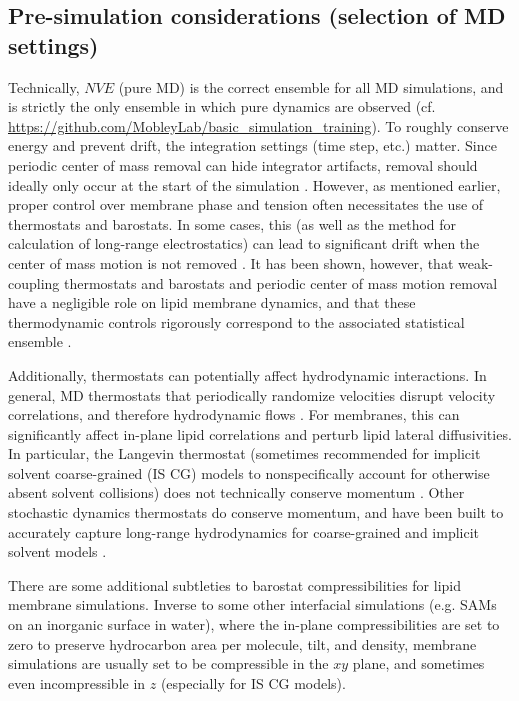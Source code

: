 \documentclass[9pt,bestpractices]{livecoms}
\begin{document}
\subsection{Pre-simulation considerations (selection of MD settings)}
\label{subsec:presim4}

Technically, $NVE$ (pure MD) is the correct ensemble for all MD simulations, and is strictly the only ensemble in which pure dynamics are observed (cf. \url{https://github.com/MobleyLab/basic_simulation_training}).
To roughly conserve energy and prevent drift, the integration settings (time step, etc.) matter.
Since periodic center of mass removal can hide integrator artifacts, removal should ideally only occur at the start of the simulation \cite{Zgorski2016}.
However, as mentioned earlier, proper control over membrane phase and tension often necessitates the use of thermostats and barostats.
In some cases, this (as well as the method for calculation of long-range electrostatics) can lead to significant drift when the center of mass motion is not removed \cite{Zgorski2016}.
It has been shown, however, that weak-coupling thermostats and barostats and periodic center of mass motion removal have a negligible role on lipid membrane dynamics, and that these thermodynamic controls rigorously correspond to the associated statistical ensemble \cite{Venable2017}.

Additionally, thermostats can potentially affect hydrodynamic interactions.
In general, MD thermostats that periodically randomize velocities disrupt velocity correlations, and therefore hydrodynamic flows \cite{Zgorski2016}.
For membranes, this can significantly affect in-plane lipid correlations and perturb lipid lateral diffusivities.
In particular, the Langevin thermostat (sometimes recommended for implicit solvent coarse-grained (IS CG) models to nonspecifically account for otherwise absent solvent collisions) does not technically conserve momentum \cite{Goga2012}.
Other stochastic dynamics thermostats do conserve momentum, and have been built to accurately capture long-range hydrodynamics for coarse-grained and implicit solvent models \cite{Zgorski2016,Wang2013}.

There are some additional subtleties to barostat compressibilities for lipid membrane simulations.
Inverse to some other interfacial simulations (e.g. SAMs on an inorganic surface in water), where the in-plane compressibilities are set to zero to preserve hydrocarbon area per molecule, tilt, and density, membrane simulations are usually set to be compressible in the $xy$ plane, and sometimes even incompressible in $z$ (especially for IS CG models).
\end{document}
